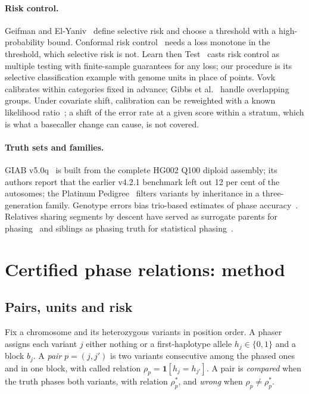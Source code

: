 \documentclass[11pt]{article}
\theoremstyle{definition}
\theoremstyle{remark}
\begin{document}
\paragraph{Risk control.} Geifman and El-Yaniv~\cite{geifman2017} define
selective risk and choose a threshold with a high-probability bound.
Conformal risk control~\cite{crc2024} needs a loss monotone in the
threshold, which selective risk is not. Learn then Test~\cite{ltt2025}
casts risk control as multiple testing with finite-sample guarantees for
any loss; our procedure is its selective classification example with genome
units in place of points. Vovk~\cite{vovk2012} calibrates within categories
fixed in advance; Gibbs et al.~\cite{gibbs2023} handle overlapping groups.
Under covariate shift, calibration can be reweighted with a known
likelihood ratio~\cite{tibshirani2019}; a shift of the error rate at a given
score within a stratum, which is what a basecaller change can cause, is not
covered.

\paragraph{Truth sets and families.} GIAB v5.0q~\cite{hansen2026} is built
from the complete HG002 Q100 diploid assembly; its authors report that the
earlier v4.2.1 benchmark left out 12 per cent of the autosomes; the Platinum Pedigree~\cite{kronenberg2025} filters
variants by inheritance in a three-generation family. Genotype errors bias
trio-based estimates of phase accuracy~\cite{browning2022}. Relatives
sharing segments by descent have served as surrogate parents for
phasing~\cite{kong2008} and siblings as phasing truth for statistical
phasing~\cite{oconnell2016}.



\section{Certified phase relations: method}\label{sec:method}

\subsection{Pairs, units and risk}\label{sec:problem}

Fix a chromosome and its heterozygous variants in position order. A phaser
assigns each variant $j$ either nothing or a first-haplotype allele
$h_j\in\{0,1\}$ and a block $b_j$. A \emph{pair} $p=(j,j')$ is two variants
consecutive among the phased ones and in one block, with called relation
$\rho_p=\mathbf{1}[h_j=h_{j'}]$. A pair is \emph{compared} when the truth
phases both variants, with relation $\rho^*_p$, and \emph{wrong} when
$\rho_p\neq\rho^*_p$.
\end{document}
